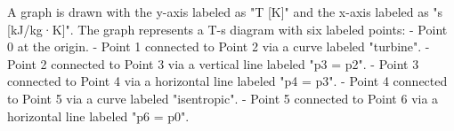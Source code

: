 A graph is drawn with the y-axis labeled as "T [K]" and the x-axis labeled as "s [kJ/kg·K]". The graph represents a T-s diagram with six labeled points:  
- Point 0 at the origin.  
- Point 1 connected to Point 2 via a curve labeled "turbine".  
- Point 2 connected to Point 3 via a vertical line labeled "p3 = p2".  
- Point 3 connected to Point 4 via a horizontal line labeled "p4 = p3".  
- Point 4 connected to Point 5 via a curve labeled "isentropic".  
- Point 5 connected to Point 6 via a horizontal line labeled "p6 = p0".